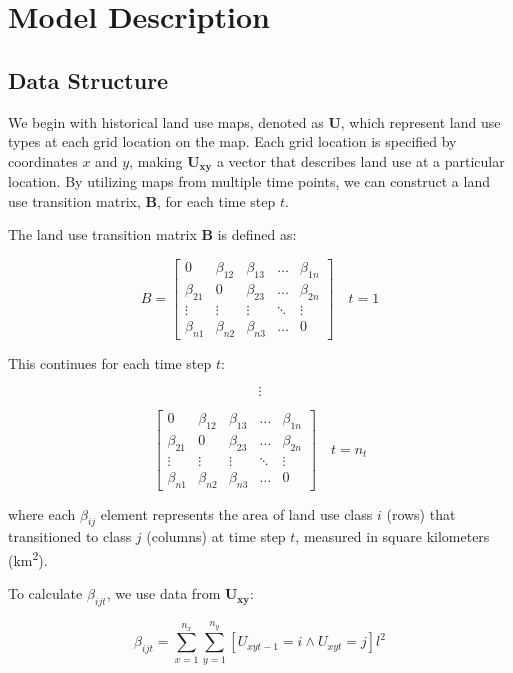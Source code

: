 \documentclass[
  letterpaper,
  DIV=11,
  numbers=noendperiod]{scrartcl}
\begin{document}
\hypertarget{model-description}{%
\section{Model Description}\label{model-description}}

\hypertarget{data-structure}{%
\subsection{Data Structure}\label{data-structure}}

We begin with historical land use maps, denoted as \(\mathbf{U}\), which
represent land use types at each grid location on the map. Each grid
location is specified by coordinates \(x\) and \(y\), making
\(\mathbf{U_{xy}}\) a vector that describes land use at a particular
location. By utilizing maps from multiple time points, we can construct
a land use transition matrix, \(\mathbf{B}\), for each time step \(t\).

The land use transition matrix \(\mathbf{B}\) is defined as:

\[
B = 
\begin{bmatrix}
0 & \beta_{12} & \beta_{13} & \dots & \beta_{1n} \\
\beta_{21} & 0 & \beta_{23} & \dots & \beta_{2n} \\
\vdots & \vdots & \vdots & \ddots & \vdots \\
\beta_{n1} & \beta_{n2} & \beta_{n3} & \dots & 0
\end{bmatrix}
\quad t=1
\]

This continues for each time step \(t\):

\[
\vdots
\]

\[
\begin{bmatrix}
0 & \beta_{12} & \beta_{13} & \dots & \beta_{1n} \\
\beta_{21} & 0 & \beta_{23} & \dots & \beta_{2n} \\
\vdots & \vdots & \vdots & \ddots & \vdots \\
\beta_{n1} & \beta_{n2} & \beta_{n3} & \dots & 0
\end{bmatrix}
\quad t=n_t
\]

where each \(\beta_{ij}\) element represents the area of land use class
\(i\) (rows) that transitioned to class \(j\) (columns) at time step
\(t\), measured in square kilometers (km\textsuperscript{2}).

To calculate \(\beta_{ijt}\), we use data from \(\mathbf{U_{xy}}\):

\[
\beta_{ijt} = \sum_{x=1}^{n_x} \sum_{y=1}^{n_y} \left[ U_{xyt-1} = i \land U_{xyt} = j \right] l^2 \tag{3}
\]
\end{document}
